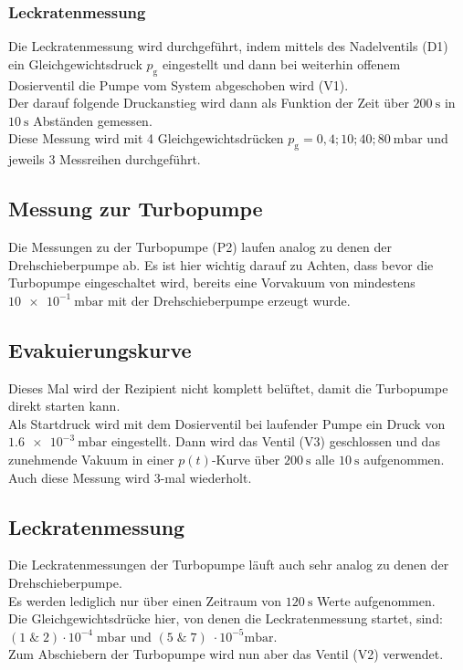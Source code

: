		\subsubsection{Leckratenmessung}

		 	Die Leckratenmessung wird durchgeführt, indem mittels des Nadelventils (D1) ein Gleichgewichtsdruck $p_\text{g}$ eingestellt und dann bei weiterhin offenem Dosierventil die Pumpe vom System abgeschoben wird (V1).\\
			Der darauf folgende Druckanstieg wird dann als Funktion der Zeit über $\SI{200}{\second}$ in $\SI{10}{\second}$ Abständen gemessen. \\
			Diese Messung wird mit 4 Gleichgewichtsdrücken $p_\text{g} = 0,4; 10; 40; \SI{80}{\milli\bar}$ und jeweils 3 Messreihen durchgeführt.

	\subsection{Messung zur Turbopumpe}

		Die Messungen zu der Turbopumpe (P2) laufen analog zu denen der Drehschieberpumpe ab. 
		Es ist hier wichtig darauf zu Achten, dass bevor die Turbopumpe eingeschaltet wird,
	    bereits eine Vorvakuum von mindestens $\SI{10e-1}{\milli\bar}$ mit der Drehschieberpumpe erzeugt wurde.
		
		\subsection{Evakuierungskurve}

			Dieses Mal wird der Rezipient nicht komplett belüftet, damit die Turbopumpe direkt starten kann. \\
			Als Startdruck  wird mit dem Dosierventil bei laufender Pumpe ein Druck von $\SI{1.6e-3}{\milli\bar}$ eingestellt.
			Dann wird das Ventil (V3) geschlossen und das zunehmende Vakuum in einer $p(t)$-Kurve über $\SI{200}{\second}$ alle $\SI{10}{\second}$ aufgenommen.\\
			Auch diese Messung wird 3-mal wiederholt.

		\subsection{Leckratenmessung}

			Die Leckratenmessungen der Turbopumpe läuft auch sehr analog zu denen der Drehschieberpumpe. \\
			Es werden lediglich nur über einen Zeitraum von $\SI{120}{\second}$ Werte aufgenommen.\\ 
			Die Gleichgewichtsdrücke hier, von denen die Leckratenmessung startet, sind: $(1\; \& \; 2)\cdot10^{-4} \; \si{\milli\bar}$ und $(5\; \& \; 7)\; \cdot10^{-5}\si{\milli\bar}$.\\
			Zum Abschiebern der Turbopumpe wird nun aber das Ventil (V2) verwendet.
